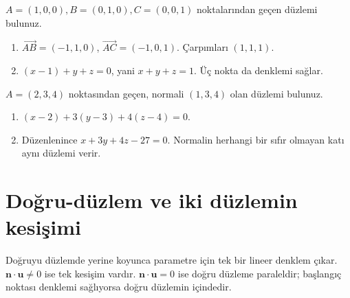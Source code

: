 \begin{tcolorbox}[title={Örnek 2.4 | Koordinat eksenlerini kesen düzlem},colframe=accent]\(A=(1,0,0),B=(0,1,0),C=(0,0,1)\) noktalarından geçen düzlemi bulunuz.
\par{}\end{tcolorbox}
\begin{tcolorbox}[title={Adım adım çözüm},colback=green!3!white,colframe=green]\begin{enumerate}
\item \(\overrightarrow{AB}=(-1,1,0)\), \(\overrightarrow{AC}=(-1,0,1)\). Çarpımları \((1,1,1)\).
\item \((x-1)+y+z=0\), yani \(x+y+z=1\). Üç nokta da denklemi sağlar.
\end{enumerate}\end{tcolorbox}
\begin{tcolorbox}[title={Örnek 2.5 | Nokta ve normal ile düzlem},colframe=accent]\(A=(2,3,4)\) noktasından geçen, normali \((1,3,4)\) olan düzlemi bulunuz.
\par{}\end{tcolorbox}
\begin{tcolorbox}[title={Adım adım çözüm},colback=green!3!white,colframe=green]\begin{enumerate}
\item \((x-2)+3(y-3)+4(z-4)=0\).
\item Düzenlenince \(x+3y+4z-27=0\). Normalin herhangi bir sıfır olmayan katı aynı düzlemi verir.
\end{enumerate}\end{tcolorbox}
\section{Doğru-düzlem ve iki düzlemin kesişimi}
Doğruyu düzlemde yerine koyunca parametre için tek bir lineer denklem çıkar. \(\mathbf n\cdot\mathbf u\ne0\) ise tek kesişim vardır. \(\mathbf n\cdot\mathbf u=0\) ise doğru düzleme paraleldir; başlangıç noktası denklemi sağlıyorsa doğru düzlemin içindedir.

